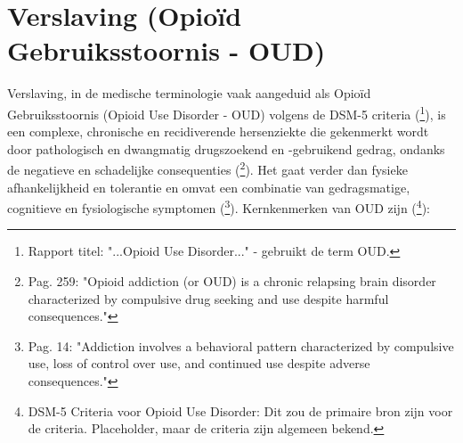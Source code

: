 \documentclass[11pt, a4paper]{report} %
\begin{document}
\section{Verslaving (Opioïd Gebruiksstoornis - OUD)}
Verslaving, in de medische terminologie vaak aangeduid als Opioïd Gebruiksstoornis (Opioid Use Disorder - OUD) volgens de DSM-5 criteria (\cite{SAMHSA2022NSDUH}\footnote{Rapport titel: "...Opioid Use Disorder..." - gebruikt de term OUD.}), is een complexe, chronische en recidiverende hersenziekte die gekenmerkt wordt door pathologisch en dwangmatig drugszoekend en -gebruikend gedrag, ondanks de negatieve en schadelijke consequenties (\cite{Cicero2017Review}\footnote{Pag. 259: "Opioid addiction (or OUD) is a chronic relapsing brain disorder characterized by compulsive drug seeking and use despite harmful consequences."}). Het gaat verder dan fysieke afhankelijkheid en tolerantie en omvat een combinatie van gedragsmatige, cognitieve en fysiologische symptomen (\cite{Kosten2002NeurobiologyDependence}\footnote{Pag. 14: "Addiction involves a behavioral pattern characterized by compulsive use, loss of control over use, and continued use despite adverse consequences."}). Kernkenmerken van OUD zijn (\cite{AmericanPsychiatricAssociationDSM5}\footnote{DSM-5 Criteria voor Opioid Use Disorder: Dit zou de primaire bron zijn voor de criteria. Placeholder, maar de criteria zijn algemeen bekend.}):
\end{document}

